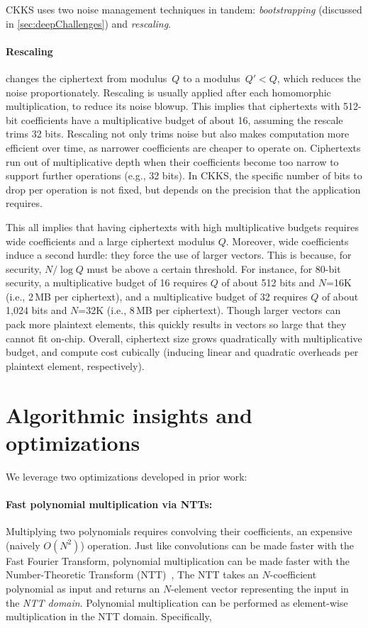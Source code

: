 CKKS uses two noise management techniques in tandem: \emph{bootstrapping}
(discussed in \autoref{sec:deepChallenges}) and \emph{rescaling}.

\paragraph{Rescaling} changes the ciphertext from modulus~$Q$ to a
modulus~$Q' < Q$, which reduces the noise proportionately. Rescaling is
usually applied after each homomorphic multiplication, to reduce its noise
blowup.
This implies that ciphertexts with
512-bit coefficients have a multiplicative budget of about 16, assuming the rescale
trims 32 bits. Rescaling not only trims noise but also makes computation more
efficient over time, as narrower coefficients are cheaper to operate on.
Ciphertexts run out of multiplicative depth when their coefficients become too
narrow to support further operations (e.g., 32 bits). In CKKS, the specific
number of bits to drop per operation is not fixed, but depends on the precision
that the application requires.

This all implies that having ciphertexts with high multiplicative budgets
requires wide coefficients and a large ciphertext modulus $Q$. Moreover, wide
coefficients induce a second hurdle: they force the use of larger vectors. This
is because, for security, $N/\log Q$ must be above a certain threshold. For
instance, for 80-bit security, a multiplicative budget of 16 requires $Q$ of
about 512 bits and $N$=16K (i.e., 2\,MB per ciphertext), and a multiplicative
budget of 32 requires $Q$ of about 1,024 bits and $N$=32K (i.e., 8\,MB per
ciphertext). Though larger vectors can pack more plaintext elements, this
quickly results in vectors so large that they cannot fit on-chip. Overall,
ciphertext size grows quadratically with multiplicative budget, and compute
cost cubically (inducing linear and quadratic overheads per plaintext element,
respectively).

\section{Algorithmic insights and optimizations}\label{sec:algoInsights}
\label{sec:fhe_optimizations}

We leverage two optimizations developed in prior work:

\paragraph{Fast polynomial multiplication via NTTs:} Multiplying two
polynomials requires convolving their coefficients, an expensive (naively
$O(N^2)$) operation. Just like convolutions can be made faster with the Fast
Fourier Transform, polynomial multiplication can be made faster with the
Number-Theoretic Transform (NTT)~\cite{moenck1976practical}, The NTT takes an
$N$\hyp{}coefficient polynomial as input and returns an $N$\hyp{}element vector
representing the input in the \textit{NTT domain}. Polynomial multiplication
can be performed as element-wise multiplication in the NTT domain.
Specifically,

